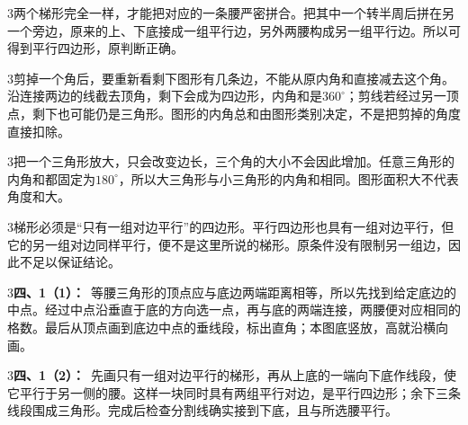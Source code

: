 \documentclass[multi=snippet,border={5bp 20bp 5bp 5bp}]{standalone}
\newenvironment{snippet}[3]{\begin{minipage}{#1bp}\color{answerred}\fontsize{#2}{#3}\selectfont\raggedright}{\end{minipage}}
\begin{document}
\begin{snippet}{505}{11.5}{14}\begin{multicols}{3}\raggedcolumns 两个梯形完全一样，才能把对应的一条腰严密拼合。把其中一个转半周后拼在另一个旁边，原来的上、下底接成一组平行边，另外两腰构成另一组平行边。所以可得到平行四边形，原判断正确。\end{multicols}\end{snippet}
\begin{snippet}{505}{11.5}{14}\begin{multicols}{3}\raggedcolumns 剪掉一个角后，要重新看剩下图形有几条边，不能从原内角和直接减去这个角。沿连接两边的线截去顶角，剩下会成为四边形，内角和是\(360^\circ\)\allowbreak ；剪线若经过另一顶点，剩下也可能仍是三角形。图形的内角总和由图形类别决定，不是把剪掉的角度直接扣除。\end{multicols}\end{snippet}
\begin{snippet}{505}{11.5}{14}\begin{multicols}{3}\raggedcolumns 把一个三角形放大，只会改变边长，三个角的大小不会因此增加。任意三角形的内角和都固定为\(180^\circ\)\allowbreak ，所以大三角形与小三角形的内角和相同。图形面积大不代表角度和大。\end{multicols}\end{snippet}
\begin{snippet}{505}{11.5}{14}\begin{multicols}{3}\raggedcolumns 梯形必须是“只有一组对边平行”的四边形。平行四边形也具有一组对边平行，但它的另一组对边同样平行，便不是这里所说的梯形。原条件没有限制另一组边，因此不足以保证结论。\end{multicols}\end{snippet}
\begin{snippet}{505}{11.5}{14}\begin{multicols}{3}\raggedcolumns \textbf{四、1（1）：}\ 等腰三角形的顶点应与底边两端距离相等，所以先找到给定底边的中点。经过中点沿垂直于底的方向选一点，再与底的两端连接，两腰便对应相同的格数。最后从顶点画到底边中点的垂线段，标出直角；本图底竖放，高就沿横向画。\end{multicols}\end{snippet}
\begin{snippet}{505}{11.5}{14}\begin{multicols}{3}\raggedcolumns \textbf{四、1（2）：}\ 先画只有一组对边平行的梯形，再从上底的一端向下底作线段，使它平行于另一侧的腰。这样一块同时具有两组平行对边，是平行四边形；余下三条线段围成三角形。完成后检查分割线确实接到下底，且与所选腰平行。\end{multicols}\end{snippet}
\end{document}
